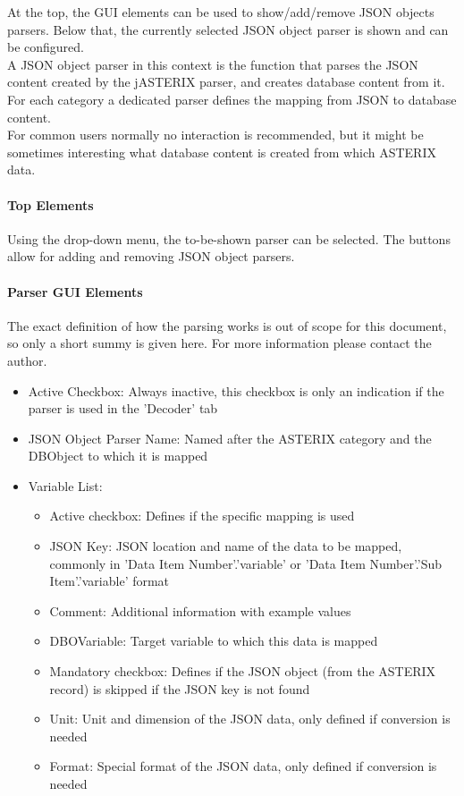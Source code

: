 At the top, the GUI elements can be used to show/add/remove JSON objects parsers. Below that, the currently selected JSON object parser is shown and can be configured. \\

A JSON object parser in this context is the function that parses the JSON content created by the jASTERIX parser, and creates database content from it. For each category a dedicated parser defines the mapping from JSON to database content. \\

For common users normally no interaction is recommended, but it might be sometimes interesting what database content is created from which ASTERIX data.

\paragraph{Top Elements}

Using the drop-down menu, the to-be-shown parser can be selected. The buttons allow for adding and removing JSON object parsers.

\paragraph{Parser GUI Elements}

The exact definition of how the parsing works is out of scope for this document, so only a short summy is given here. For more information please contact the author.


\begin{itemize}  
\item Active Checkbox: Always inactive, this checkbox is only an indication if the parser is used in the 'Decoder' tab
\item JSON Object Parser Name: Named after the ASTERIX category and the DBObject to which it is mapped
\item Variable List:
\begin{itemize}  
\item Active checkbox: Defines if the specific mapping is used
\item JSON Key: JSON location and name of the data to be mapped, commonly in 'Data Item Number'.'variable' or 'Data Item Number'.'Sub Item'.'variable' format
\item Comment: Additional information with example values
\item DBOVariable: Target variable to which this data is mapped
\item Mandatory checkbox: Defines if the JSON object (from the ASTERIX record) is skipped if the JSON key is not found
\item Unit: Unit and dimension of the JSON data, only defined if conversion is needed
\item Format: Special format of the JSON data, only defined if conversion is needed
\end{itemize}
\end{itemize}
\ \\

